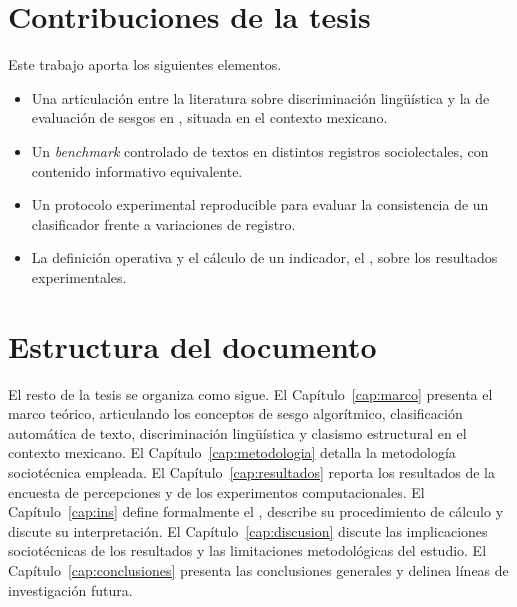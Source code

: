 \section{Contribuciones de la tesis}
\label{sec:contribuciones}

Este trabajo aporta los siguientes elementos.

\begin{itemize}
  \item Una articulación entre la literatura sobre discriminación lingüística
    y la de evaluación de sesgos en \PLN, situada en el contexto mexicano.
  \item Un \emph{benchmark} controlado de textos en distintos registros
    sociolectales, con contenido informativo equivalente.
  \item Un protocolo experimental reproducible para evaluar la consistencia
    de un clasificador frente a variaciones de registro.
  \item La definición operativa y el cálculo de un indicador, el \INS, sobre
    los resultados experimentales.
\end{itemize}

\section{Estructura del documento}
\label{sec:estructura}

El resto de la tesis se organiza como sigue. El Capítulo~\ref{cap:marco}
presenta el marco teórico, articulando los conceptos de sesgo algorítmico,
clasificación automática de texto, discriminación lingüística y clasismo
estructural en el contexto mexicano. El Capítulo~\ref{cap:metodologia}
detalla la metodología sociotécnica empleada. El Capítulo~\ref{cap:resultados}
reporta los resultados de la encuesta de percepciones y de los experimentos
computacionales. El Capítulo~\ref{cap:ins} define formalmente el \INS,
describe su procedimiento de cálculo y discute su interpretación. El
Capítulo~\ref{cap:discusion} discute las implicaciones sociotécnicas de los
resultados y las limitaciones metodológicas del estudio. El
Capítulo~\ref{cap:conclusiones} presenta las conclusiones generales y
delinea líneas de investigación futura.
